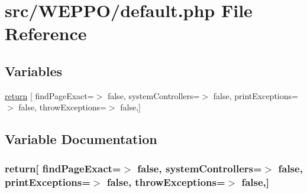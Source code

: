 \hypertarget{default_8php}{}\section{src/\+W\+E\+P\+P\+O/default.php File Reference}
\label{default_8php}
\subsection*{Variables}
\begin{DoxyCompactItemize}
\item 
\hyperlink{default_8php_a7117aa22aee4758467ec6aed13b6b0c0}{return} \mbox{[} \textquotesingle{}find\+Page\+Exact\textquotesingle{}=$>$ false, \textquotesingle{}system\+Controllers\textquotesingle{}=$>$ false, \textquotesingle{}print\+Exceptions\textquotesingle{}=$>$ false, \textquotesingle{}throw\+Exceptions\textquotesingle{}=$>$ false,\mbox{]}
\end{DoxyCompactItemize}


\subsection{Variable Documentation}
\subsubsection[{\texorpdfstring{return}{return}}]{\setlength{\rightskip}{0pt plus 5cm}return\mbox{[} \textquotesingle{}find\+Page\+Exact\textquotesingle{}=$>$ false, \textquotesingle{}system\+Controllers\textquotesingle{}=$>$ false, \textquotesingle{}print\+Exceptions\textquotesingle{}=$>$ false, \textquotesingle{}throw\+Exceptions\textquotesingle{}=$>$ false,\mbox{]}}\hypertarget{default_8php_a7117aa22aee4758467ec6aed13b6b0c0}{}\label{default_8php_a7117aa22aee4758467ec6aed13b6b0c0}
